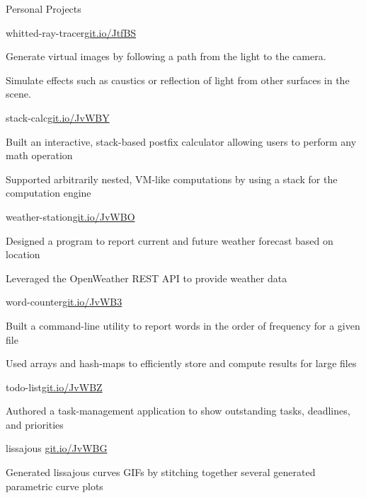 \documentclass{resume} %
\begin{document}
\begin{rSection}{Personal Projects}
  \begin{rSubsection}{whitted-ray-tracer}{\href{https://git.io/JtfBS}{git.io/JtfBS}}{}{}
    \item Generate virtual images by following a path from the light to the camera.
    \item Simulate effects such as caustics or reflection of light from other surfaces in the scene.
  \end{rSubsection}

  \begin{rSubsection}{stack-calc}{\href{https://git.io/JvWBY}{git.io/JvWBY}}{}{}
    \item Built an interactive, stack-based postfix calculator allowing users
      to perform any math operation
    \item Supported arbitrarily nested, VM-like computations by using a stack
      for the computation engine
  \end{rSubsection}

  \begin{rSubsection}{weather-station}{\href{https://git.io/JvWBO}{git.io/JvWBO}}{}{}
    \item Designed a program to report current and future weather forecast
      based on location
    \item Leveraged the OpenWeather REST API to provide weather data
  \end{rSubsection}

  \begin{rSubsection} {word-counter}{\href{https://git.io/JvWB3}{git.io/JvWB3}}{}{}
    \item Built a command-line utility to report words in the order of
      frequency for a given file
    \item Used arrays and hash-maps to efficiently store and compute results
      for large files
  \end{rSubsection}

  \begin{rSubsection} {todo-list}{\href{https://git.io/JvWBZ}{git.io/JvWBZ}}{}{}
    \item Authored a task-management application to show outstanding tasks,
      deadlines, and priorities
  \end{rSubsection}

  \begin{rSubsection}{lissajous} {\href{https://git.io/JvWBG}{git.io/JvWBG}}{}{}
    \item Generated lissajous curves GIFs by stitching together several generated
      parametric curve plots
  \end{rSubsection}


\end{rSection}
\end{document}
